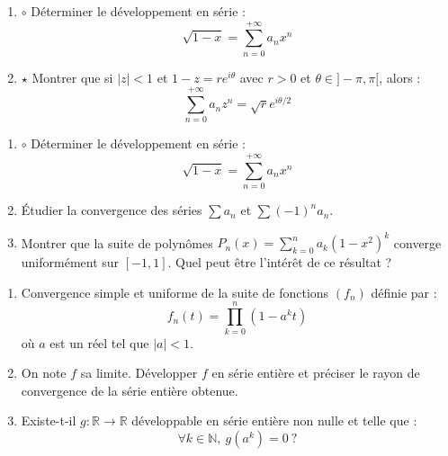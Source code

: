 \documentclass[french,a4paper]{article}
\newcommand{\N}{\mathbb{N}}
\newcommand{\R}{\mathbb{R}}
\theoremstyle{plain}
\theoremstyle{definition}
\theoremstyle{remark}
\begin{document}
\begin{ex}[Moulin.SE.44]{}
	\begin{enumerate}
		\item $\circ$ Déterminer le développement en série : $$\sqrt{1-x}=\sum_{n=0}^{+\infty}a_nx^n$$
		\item $\star$ Montrer que si $\lvert z\rvert<1$ et $1-z=re^{i\theta}$ avec $r>0$ et $\theta\in]-\pi,\pi[$, alors : $$\sum_{n=0}^{+\infty}a_nz^n=\sqrt{r}e^{i\theta/2}$$
	\end{enumerate}
\end{ex}

\begin{ex}[Moulin.SE.45]{}
	\begin{enumerate}
		\item $\circ$ Déterminer le développement en série : $$\sqrt{1-x}=\sum_{n=0}^{+\infty}a_nx^n$$
		\item Étudier la convergence des séries $\displaystyle\sum a_n$ et $\displaystyle\sum(-1)^na_n$.
		\item Montrer que la suite de polynômes $P_n(x)=\displaystyle\sum_{k=0}^{n}a_k(1-x^2)^k$ converge uniformément sur $[-1,1]$. Quel peut être l'intérêt de ce résultat ?
	\end{enumerate}
\end{ex}

\begin{ex}[Moulin.SE.46]{}
	\begin{enumerate}
		\item Convergence simple et uniforme de la suite de fonctions $(f_n)$ définie par : $$f_n(t)=\prod_{k=0}^{n}(1-a^kt)$$ où $a$ est un réel tel que $\lvert a\rvert<1$.
		\item On note $f$ sa limite. Développer $f$ en série entière et préciser le rayon de convergence de la série entière obtenue.
		\item Existe-t-il $g:\R\to\R$ développable en série entière non nulle et telle que : $$\forall k\in\N,\ g(a^k)=0\ ?$$
	\end{enumerate}
\end{ex}
\end{document}

